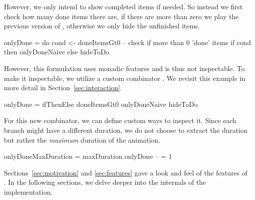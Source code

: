 However, we only intend to show completed items if needed.
So instead we first check how many done items there are, if there are more than zero we play the previous version of ,
otherwise we only hide the unfinished items.

\begin{spec}
onlyDone = do
  cond <- doneItemsGt0    -- check if more than 0 'done' items
  if cond then onlyDoneNaive else hideToDo
\end{spec}

However, this formulation uses monadic features and is thus not inspectable.
To make it inspectable, we utilize a custom combinator .
We revisit this example in more detail in Section~\ref{sec:interaction}.

\begin{spec}
onlyDone = ifThenElse doneItemsGt0 onlyDoneNaive hideToDo
\end{spec}

For this new combinator, we can define custom ways to inspect it. Since each
branch might have a different duration, we do not choose to extract the
duration but rather the \emph{maximum} duration of the animation.

\begin{spec}
onlyDoneMaxDuration = maxDuration onlyDone -- = 1
\end{spec}

Sections~\ref{sec:motivation} and \ref{sec:features} gave a look and feel of the
features of \dsl{}. In the following sections, we delve deeper into the
internals of the implementation.

